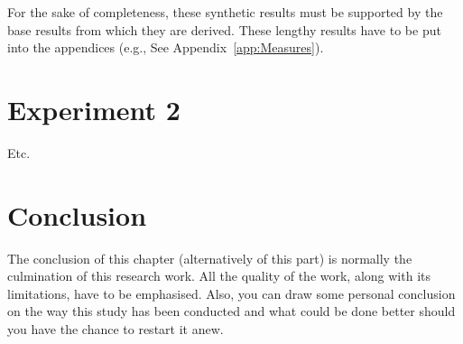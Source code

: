 For the sake of completeness, these synthetic results must be supported by the base results from which they are derived.  These lengthy results have to be put into the appendices (e.g., See Appendix~\ref{app:Measures}).

\section{Experiment 2}

Etc.

\section{Conclusion}

The conclusion of this chapter (alternatively of this part) is normally the culmination of this research work.  All the quality of the work, along with its limitations, have to be emphasised.  Also, you can draw some personal conclusion on the way this study has been conducted and what could be done better should you have the chance to restart it anew.

